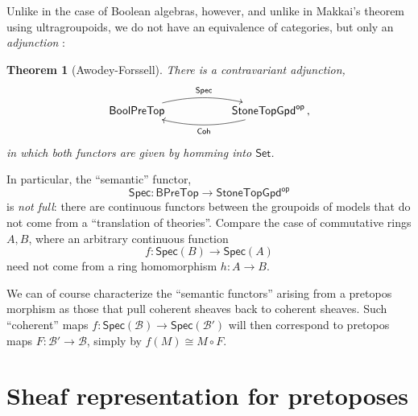 \documentclass[12pt]{article}
\newtheorem*{theorem*}{Theorem}
\theoremstyle{remark}
\theoremstyle{definition}
\begin{document}
Unlike in the case of Boolean algebras, however, and unlike in Makkai's theorem using ultragroupoids, we do not have an equivalence of categories, but only an \emph{adjunction} \cite{AF}:
 
\begin{theorem*}[Awodey-Forssell]
There is a contravariant adjunction,
\[
\xymatrix{ 
\mathsf{BoolPreTop}  \ar@/{}^{1pc}/[rr]^{\mathsf{Spec}}     &&  \mathsf{StoneTopGpd}^{\mathsf{op}}  \ar@/{}^{1pc}/[ll]^{\mathsf{Coh}} \,,
} 
\]
in which both functors are given by homming into $\mathsf{Set}$.
\end{theorem*}

In particular, the ``semantic'' functor,
\[
\mathsf{Spec} : \mathsf{BPreTop} \longrightarrow \mathsf{StoneTopGpd}^{\mathsf{op}}
\]
 is \emph{not full}: there are continuous functors between the groupoids of models that do not come from a ``translation of theories''.
Compare the case of commutative rings $A, B$, where an arbitrary continuous function $$f : \mathsf{Spec}(B) \to \mathsf{Spec}(A)$$ need not come from a ring homomorphism $h : A\to B$.  

We can of course characterize the ``semantic functors'' arising from a pretopos morphism as those that pull coherent sheaves back to coherent sheaves.  Such ``coherent'' maps  $f : \mathsf{Spec}(\mathcal{B}) \to \mathsf{Spec}(\mathcal{B'})$ will then correspond to pretopos maps $F : \mathcal{B'} \to \mathcal{B}$, simply  by $f(M) \cong M\circ F$. 



%


\section{Sheaf representation for pretoposes}
\end{document}

